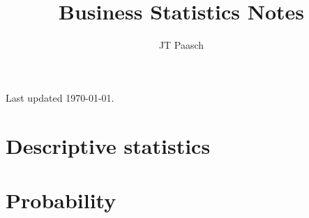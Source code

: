 \documentclass{book} %
\begin{document}
\frontmatter 

\title{Business Statistics Notes}
\author{JT Paasch}

\maketitle
\newpage

\thispagestyle{empty}
\mbox{}\vfill

\begin{center}
Last updated \today.
\end{center}

\tableofcontents

\mainmatter



\part{Descriptive statistics}







\part{Probability}





















\end{document}
